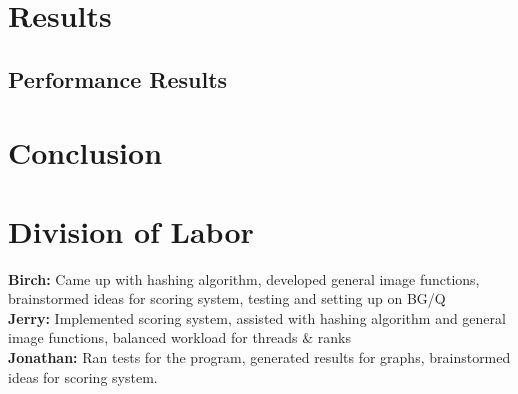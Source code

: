 \documentclass[10pt, journal]{vgtc}                %
\begin{document}
\section{Results}

\subsection{Performance Results}


\section{Conclusion}

\section{Division of Labor}
\textbf{Birch:} Came up with hashing algorithm, developed general image functions, brainstormed ideas for scoring system, testing and setting up on BG/Q\\
\textbf{Jerry:} Implemented scoring system, assisted with hashing algorithm and general image functions, balanced workload for threads \& ranks\\
\textbf{Jonathan:} Ran tests for the program, generated results for graphs, brainstormed ideas for scoring system.





\nocite{*}

\end{document}
